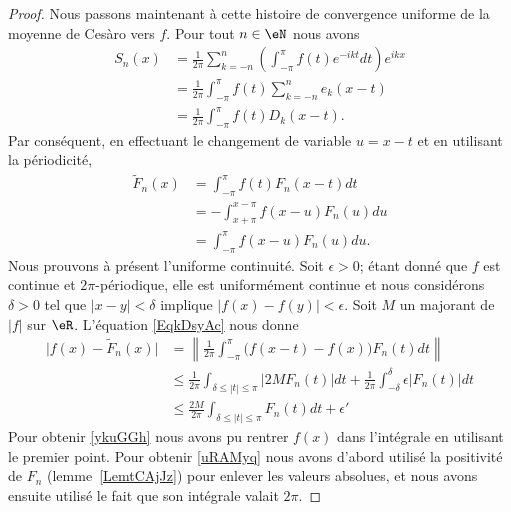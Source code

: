 \begin{proof}
	Nous passons maintenant à cette histoire de convergence uniforme de la moyenne de Cesàro vers \( f\). Pour tout \( n\in \eN\) nous avons
	\begin{subequations}
		\begin{align}
			S_n(x) & =\frac{1}{ 2\pi }\sum_{k=-n}^n\left( \int_{-\pi}^{\pi}f(t) e^{-ikt}dt \right) e^{ikx} \\
			       & =\frac{1}{ 2\pi }\int_{-\pi}^{\pi}f(t)\sum_{k=-n}^ne_k(x-t)                           \\
			       & =\frac{1}{ 2\pi }\int_{-\pi}^{\pi}f(t)D_k(x-t).
		\end{align}
	\end{subequations}
	Par conséquent, en effectuant le changement de variable \( u=x-t\) et en utilisant la périodicité,
	\begin{subequations}    \label{EqkDsyAc}
		\begin{align}
			\tilde F_n(x) & =\int_{-\pi}^{\pi}f(t)F_n(x-t)dt     \\
			              & =-\int_{x+\pi}^{x-\pi}f(x-u)F_n(u)du \\
			              & =\int_{-\pi}^{\pi}f(x-u) F_n(u)du.
		\end{align}
	\end{subequations}
	Nous prouvons à présent l'uniforme continuité. Soit \( \epsilon>0\); étant donné que \( f\) est continue et \( 2\pi\)-périodique, elle est uniformément continue et nous considérons \( \delta>0\) tel que \( | x-y |<\delta\) implique \( \big| f(x)-f(y) \big|<\epsilon\). Soit \( M\) un majorant de \( | f |\) sur \( \eR\). L'équation \eqref{EqkDsyAc} nous donne
	\begin{subequations}
		\begin{align}
			\big| f(x)-\tilde F_n(x) \big| & =\left\| \frac{1}{ 2\pi }\int_{-\pi}^{\pi}\big( f(x-t)-f(x) \big)F_n(t)dt \right\|    \label{ykuGGh}                         \\
			                               & \leq\frac{1}{ 2\pi }\int_{\delta\leq| t |\leq \pi}| 2MF_n(t) |dt+\frac{1}{ 2\pi }\int_{-\delta}^{\delta}\epsilon| F_n(t) |dt \\
			                               & \leq\frac{ 2M }{ 2\pi }\int_{\delta\leq | t |\leq\pi}F_n(t)dt+\epsilon'     \label{uRAMyq}
		\end{align}
	\end{subequations}
	Pour obtenir \eqref{ykuGGh} nous avons pu rentrer \( f(x)\) dans l'intégrale en utilisant le premier point. Pour obtenir \eqref{uRAMyq} nous avons d'abord utilisé la positivité de \( F_n\) (lemme~\ref{LemtCAjJz}) pour enlever les valeurs absolues, et nous avons ensuite utilisé le fait que son intégrale valait \( 2\pi\).


\end{proof}
